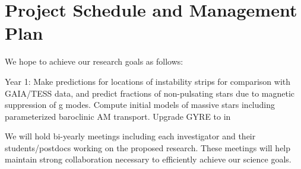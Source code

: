 \section{Project Schedule and Management Plan}

We hope to achieve our research goals as follows:

Year 1: Make predictions for locations of instability strips for comparison with GAIA/TESS data, and predict fractions of non-pulsating stars due to magnetic suppression of g modes. Compute initial models of massive stars including parameterized baroclinic AM transport.  Upgrade GYRE to in

We will  hold bi-yearly meetings including each investigator and their students/postdocs working on the proposed research. These meetings will help maintain strong collaboration necessary to efficiently achieve our science goals.

